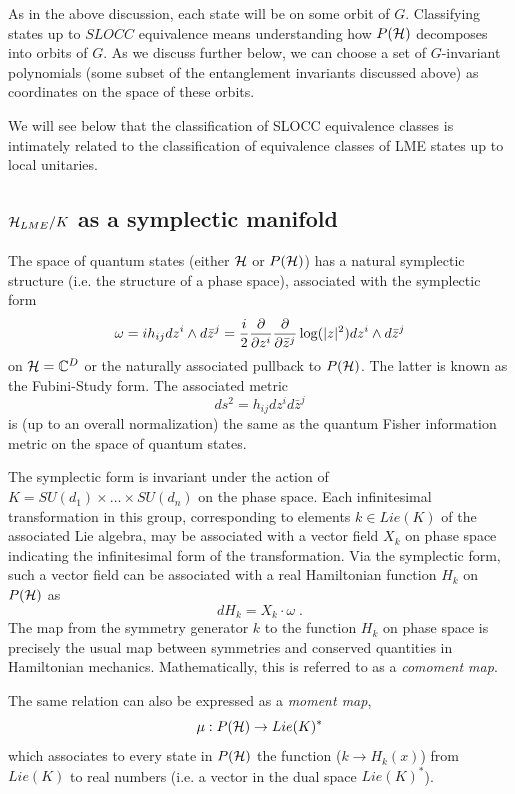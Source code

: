 \documentclass[12pt]{article}
\theoremstyle{definition}
\newcommand{\be}{\begin{equation}}
\newcommand{\ee}{\end{equation}}
\begin{document}
As in the above discussion, each state will be on some orbit of $G$. Classifying states up to $SLOCC$ equivalence means understanding how $P({\cal H})$ decomposes into orbits of $G$. As we discuss further below, we can choose a set of $G$-invariant polynomials (some subset of the entanglement invariants discussed above) as coordinates on the space of these orbits.

We will see below that the classification of SLOCC equivalence classes is intimately related to the classification of equivalence classes of LME states up to local unitaries.

\subsection{${\cal H}_{LME}/K$ as a symplectic manifold}

The space of quantum states (either ${\cal H}$ or $P({\cal H})$) has a natural symplectic structure (i.e. the structure of a phase space), associated with the symplectic form
\be
\omega = i h_{ij} dz^{i} \wedge  d\bar{z}^j =  {i \over 2} {\partial \over \partial z^i} {\partial \over \partial \bar{z}^j} \log (|z|^2) dz^{i} \wedge  d\bar{z}^j
\ee
on ${\cal H} = \mathbb{C}^D$ or the naturally associated pullback to $P({\cal H})$. The latter is known as the Fubini-Study form. The associated metric
\be
ds^2 = h_{ij} dz^i d \bar{z}^j
\ee
is (up to an overall normalization) the same as the quantum Fisher information metric on the space of quantum states.

The symplectic form is invariant under the action of $K = SU(d_1) \times \dots \times SU(d_n)$ on the phase space. Each infinitesimal transformation  in this group, corresponding to elements $k \in Lie(K)$ of the associated Lie algebra, may be associated with a vector field $X_k$ on phase space indicating the infinitesimal form of the transformation. Via the symplectic form, such a vector field can be associated with a real Hamiltonian function $H_k$ on $P({\cal H})$ as
\be
d H_k = {X_k} \cdot \omega \; .
\ee
The map from the symmetry generator $k$ to the function $H_k$ on phase space is precisely the usual map between symmetries and conserved quantities in Hamiltonian mechanics. Mathematically, this is referred to as a {\it comoment map}.

The same relation can also be expressed as a {\it moment map},
\be
\mu : P({\cal H}) \to Lie(K)^*
\ee
which associates to every state in $P({\cal H})$ the function ($k \to H_k(x)$) from $Lie(K)$ to real numbers (i.e. a vector in the dual space $Lie(K)^*$).
\end{document}
